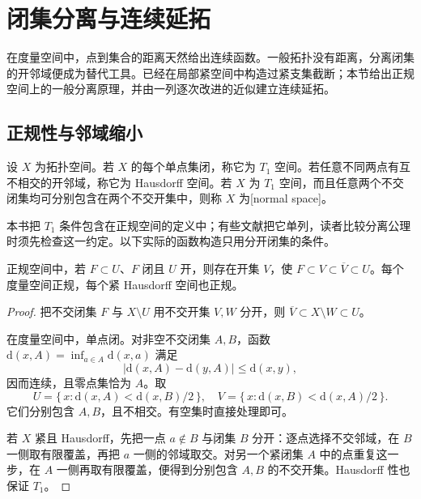 \section{闭集分离与连续延拓}
\label{b1:sec:A104}

在度量空间中，点到集合的距离天然给出连续函数。一般拓扑没有距离，分离闭集的开邻域便成为替代工具。已经在局部紧空间中构造过紧支集截断；本节给出正规空间上的一般分离原理，并由一列逐次改进的近似建立连续延拓。

\subsection{正规性与邻域缩小}
\label{b1:subsec:A10401}

\begin{definition}\label{b1:def:app-normal}
设 \(X\) 为拓扑空间。若 \(X\) 的每个单点集闭，称它为 \(T_1\) 空间。若任意不同两点有互不相交的开邻域，称它为 Hausdorff 空间。若 \(X\) 为 \(T_1\) 空间，而且任意两个不交闭集均可分别包含在两个不交开集中，则称 \(X\) 为[normal space]。
\end{definition}

本书把 \(T_1\) 条件包含在正规空间的定义中；有些文献把它单列，读者比较分离公理时须先检查这一约定。以下实际的函数构造只用分开闭集的条件。

\begin{lemma}\label{b1:lem:app-normal-shrink}
正规空间中，若 \(F\subset U\)、\(F\) 闭且 \(U\) 开，则存在开集 \(V\)，使 \(F\subset V\subset\overline V\subset U\)。每个度量空间正规，每个紧 Hausdorff 空间也正规。
\end{lemma}
\begin{proof}
把不交闭集 \(F\) 与 \(X\setminus U\) 用不交开集 \(V,W\) 分开，则 \(\overline V\subset X\setminus W\subset U\)。

在度量空间中，单点闭。对非空不交闭集 \(A,B\)，函数 \(\mathrm{d}(x,A)=\inf_{a\in A}\mathrm{d}(x,a)\) 满足
\[
 |\mathrm{d}(x,A)-\mathrm{d}(y,A)|\le \mathrm{d}(x,y),
\]
因而连续，且零点集恰为 \(A\)。取
\[
 U=\{\,x:\mathrm{d}(x,A)<\mathrm{d}(x,B)/2\,\},\quad
 V=\{\,x:\mathrm{d}(x,B)<\mathrm{d}(x,A)/2\,\}.
\]
它们分别包含 \(A,B\)，且不相交。有空集时直接处理即可。

若 \(X\) 紧且 Hausdorff，先把一点 \(a\notin B\) 与闭集 \(B\) 分开：逐点选择不交邻域，在 \(B\) 一侧取有限覆盖，再把 \(a\) 一侧的邻域取交。对另一个紧闭集 \(A\) 中的点重复这一步，在 \(A\) 一侧再取有限覆盖，便得到分别包含 \(A,B\) 的不交开集。Hausdorff 性也保证 \(T_1\)。
\end{proof}

